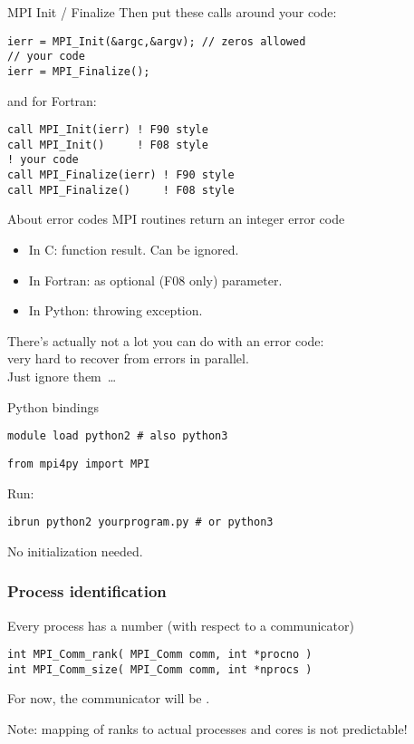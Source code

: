 \begin{frame}[containsverbatim]{MPI Init / Finalize}
Then put these calls around your code:
\lstset{language=C}
\begin{lstlisting}
ierr = MPI_Init(&argc,&argv); // zeros allowed
// your code
ierr = MPI_Finalize();  
\end{lstlisting}
and for Fortran:
\lstset{language=Fortran}
\begin{lstlisting}
call MPI_Init(ierr) ! F90 style
call MPI_Init()     ! F08 style
! your code
call MPI_Finalize(ierr) ! F90 style
call MPI_Finalize()     ! F08 style
\end{lstlisting}
\end{frame}

\begin{frame}{About error codes}
  MPI routines return an integer error code
  \begin{itemize}
  \item In C: function result. Can be ignored.
  \item In Fortran: as optional (F08 only) parameter.
  \item In Python: throwing exception.
  \end{itemize}
  There's actually not a lot you can do with an error code:\\
  very hard to recover from errors in parallel.\\
  Just ignore them~\ldots
\end{frame}

\begin{tacc}
\begin{frame}[containsverbatim]{Python bindings}
\begin{verbatim}
module load python2 # also python3
\end{verbatim}
\begin{verbatim}
from mpi4py import MPI
\end{verbatim}
Run:
\begin{verbatim}
ibrun python2 yourprogram.py # or python3
\end{verbatim}
  No initialization needed.
\end{frame}
\end{tacc}

\begin{exerciseframe}[hello]
  
\end{exerciseframe}

\begin{frame}[containsverbatim]\frametitle{Process identification}
Every process has a number (with respect to a communicator)
\lstset{language=C}
\begin{lstlisting}
int MPI_Comm_rank( MPI_Comm comm, int *procno )
int MPI_Comm_size( MPI_Comm comm, int *nprocs )
\end{lstlisting}
For now, the communicator will be .

Note: mapping of ranks to actual processes and cores is not predictable!
\end{frame}

